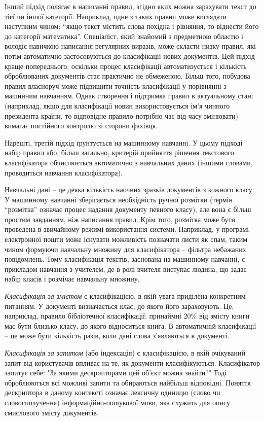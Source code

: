 Інший підхід полягає в написанні правил, згідно яких можна зарахувати текст до тієї чи іншої категорії. Наприклад, одне з таких правил може виглядати наступним чином: “якщо текст містить слова похідна і рівняння, то віднести його до категорії математика”. Спеціаліст, який знайомий з предметною областю і володіє навичкою написання регулярних виразів, може скласти низку правил, які потім автоматично застосовуються до класифікації нових документів. Цей підхід краще попереднього, оскільки процес класифікації автоматизується і кількість оброблюваних документів стає практично не обмеженою. Більш того, побудова правил власноруч може підвищити точність класифікації у порівнянні з машинним навчанням. Однак створення і підтримка правил в актуальному стані (наприклад, якщо для класифікації новин використовується ім'я чинного президента країни, то відповідне правило потрібно час від часу змінювати) вимагає постійного контролю зі сторони фахівця.

Нарешті, третій підхід ґрунтується на машинному навчанні. У цьому підході набір правил або, більш загально, критерій прийняття рішення текстового класифікатора обчислюється автоматично з навчальних даних (іншими словами, проводиться навчання класифікатора).

Навчальні дані – це деяка кількість наочних зразків документів з кожного класу. У машинному навчанні зберігається необхідність ручної розмітки (термін “розмітка” означає процес надання документу певного класу), але вона є більш простим завданням, ніж написання правил. Крім того, розмітка може бути проведена в звичайному режимі використання системи. Наприклад, у програмі електронної пошти може існувати можливість позначати листи як спам, таким чином формуючи навчальну множину для класифікатора – фільтра небажаних повідомлень. Тому класифікація текстів, заснована на машинному навчанні, є прикладом навчання з учителем, де в ролі вчителя виступає людина, що задає набір класів і розмічає навчальну множину.

\textit{Класифікація за змістом} є класифікацією, в якій увага приділена конкретним питанням. У документі визначається клас, до якого його зараховують. Це, наприклад, правило бібліотечної класифікації: принаймні 20\% від змісту книги має бути близько класу, до якого відноситься книга. В автоматичній класифікації – це може бути кількість разів, коли дані слова з'являються в документі.


\textit{Класифікація за запитом} (або індексація) є класифікацією, в якій очікуваний запит від користувачів впливає на те, як документи класифікуються. Класифікатор запитує себе: "За якими дескрипторами цей об'єкт можна знайти?" Тоді оброблюються всі можливі запити та обираються найбільш відповідні. Поняття дескриптора в даному контексті означає лексичну одиницю (слово чи словосполучення) інформаційно-пошукової мови, яка служить для опису смислового змісту документів.

